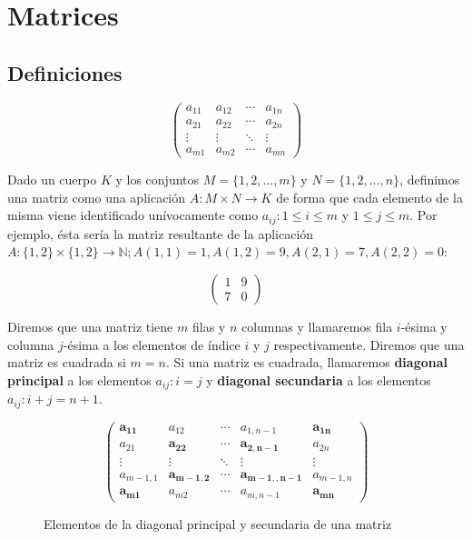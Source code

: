 \section{Matrices}\label{matrices}

\subsection{Definiciones}\label{matrices-definiciones}

\[
	\begin{pmatrix}
		a_{11} & a_{12} & \cdots & a_{1n} \\
		a_{21} & a_{22} & \cdots & a_{2n} \\
		\vdots & \vdots & \ddots & \vdots \\
		a_{m1} & a_{m2} & \cdots & a_{mn}
	\end{pmatrix}
\]

Dado un cuerpo $K$ y los conjuntos $M = \{1,2,\ldots,m\}$ y $N = \{1,2,\ldots,n\}$, definimos una matriz como una aplicación $A : M \times N \rightarrow K$ de forma que cada elemento de la misma viene identificado unívocamente como $a_{ij} : 1 \leq i \leq m$ y $1 \leq j \leq m$.
Por ejemplo, ésta sería la matriz resultante de la aplicación $A : \{1,2\} \times \{1,2\} \rightarrow \mathbb{N}; A(1,1) = 1, A(1,2) = 9, A(2,1) = 7, A(2,2) = 0$:

\[
	\begin{pmatrix}
		1 & 9 \\
		7 & 0
	\end{pmatrix}
\]

Diremos que una matriz tiene $m$ filas y $n$ columnas y llamaremos fila $i$-ésima y columna $j$-ésima a los elementos de índice $i$ y $j$ respectivamente.
Diremos que una matriz es cuadrada si $m = n$.
Si una matriz es cuadrada, llamaremos \textbf{diagonal principal} a los elementos $a_{ij} : i = j$ y \textbf{diagonal secundaria} a los elementos $a_{ij} : i+j = n+1$.

\begin{figure}[h!]
\[
	\begin{pmatrix}
		\boldsymbol{a_{11}} & a_{12}                 & \cdots & a_{1,n-1}                 & \boldsymbol{a_{1n}} \\
		a_{21}              & \boldsymbol{a_{22}}    & \cdots & \boldsymbol{a_{2,n-1}}    & a_{2n}              \\
		\vdots              & \vdots                 & \ddots & \vdots                    & \vdots              \\
		a_{m-1,1}           & \boldsymbol{a_{m-1,2}} & \cdots & \boldsymbol{a_{m-1,,n-1}} & a_{m-1,n}           \\
		\boldsymbol{a_{m1}} & a_{m2}                 & \cdots & a_{m,n-1}                 & \boldsymbol{a_{mn}}
	\end{pmatrix}
\]
\caption{Elementos de la diagonal principal y secundaria de una matriz}
\end{figure}

